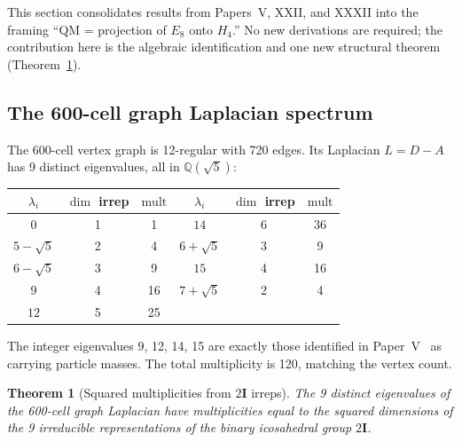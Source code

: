 \documentclass[12pt]{article}
\newtheorem{theorem}{Theorem}
\newcommand{\twoI}{2\mathbf{I}}
\begin{document}
This section consolidates results from Papers~V, XXII, and XXXII into the framing ``QM = projection of $E_8$ onto $H_4$.'' No new derivations are required; the contribution here is the algebraic identification and one new structural theorem (Theorem~\ref{thm:burnside}).

\subsection{The 600-cell graph Laplacian spectrum}

The 600-cell vertex graph is 12-regular with 720 edges. Its Laplacian $L = D - A$ has 9 distinct eigenvalues, all in $\mathbb{Q}(\sqrt{5})$:
\begin{center}
\small
\begin{tabular}{ccc|ccc}
\toprule
$\lambda_i$ & $\dim$ irrep & $\mathrm{mult}$ & $\lambda_i$ & $\dim$ irrep & $\mathrm{mult}$ \\
\midrule
$0$         & 1 & 1  & $14$            & 6 & 36 \\
$5-\sqrt{5}$ & 2 & 4  & $6+\sqrt{5}$    & 3 & 9  \\
$6-\sqrt{5}$ & 3 & 9  & $15$            & 4 & 16 \\
$9$         & 4 & 16 & $7+\sqrt{5}$    & 2 & 4  \\
$12$        & 5 & 25 &                 &   &    \\
\bottomrule
\end{tabular}
\end{center}
The integer eigenvalues 9, 12, 14, 15 are exactly those identified in Paper~V~\citep{SmartV} as carrying particle masses. The total multiplicity is 120, matching the vertex count.

\begin{theorem}[Squared multiplicities from $\twoI$ irreps]\label{thm:burnside}
The 9 distinct eigenvalues of the 600-cell graph Laplacian have multiplicities equal to the squared dimensions of the 9 irreducible representations of the binary icosahedral group $\twoI$.
\end{theorem}
\end{document}
